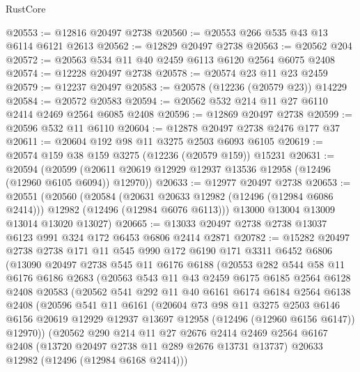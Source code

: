 \begin{lexlean}{RustCore}
\begin{coremodule}
@20553 := @12816 @20497 @2738
@20560 := @20553 @266 @535 @43 @13 @6114 @6121 @2613
@20562 := @12829 @20497 @2738
@20563 := @20562 @204
@20572 := @20563 @534 @11 @40 @2459 @6113 @6120 @2564 @6075 @2408
@20574 := @12228 @20497 @2738
@20578 := @20574 @23 @11 @23 @2459
@20579 := @12237 @20497
@20583 := @20578 (@12236 (@20579 @23)) @14229
@20584 := @20572 @20583
@20594 := @20562 @532 @214 @11 @27 @6110 @2414 @2469 @2564 @6085 @2408
@20596 := @12869 @20497 @2738
@20599 := @20596 @532 @11 @6110
@20604 := @12878 @20497 @2738 @2476 @177 @37
@20611 := @20604 @192 @98 @11 @3275 @2503 @6093 @6105
@20619 := @20574 @159 @38 @159 @3275 (@12236 (@20579 @159)) @15231
@20631 := @20594
    (@20599 (@20611 @20619 @12929 @12937 @13536 @12958 (@12496 (@12960 @6105 @6094)) @12970))
@20633 := @12977 @20497 @2738
@20653 := @20551
    (@20560
      (@20584
        (@20631 @20633 @12982 (@12496 (@12984 @6086 @2414)))
        @12982
        (@12496 (@12984 @6076 @6113)))
      @13000
      @13004
      @13009
      @13014
      @13020
      @13027)
@20665 := @13033 @20497 @2738 @2738 @13037 @6123 @991 @324 @172 @6453 @6806 @2414 @2871
@20782 := @15282
    @20497
    @2738
    @2738
    @171
    @11
    @545
    @990
    @172
    @6190
    @171
    @3311
    @6452
    @6806
    (@13090
      @20497
      @2738
      @545
      @11
      @6176
      @6188
      (@20553
        @282
        @544
        @58
        @11
        @6176
        @6186
        @2683
        (@20563
          @543
          @11
          @43
          @2459
          @6175
          @6185
          @2564
          @6128
          @2408
          @20583
          (@20562
            @541
            @292
            @11
            @40
            @6161
            @6174
            @6184
            @2564
            @6138
            @2408
            (@20596
              @541
              @11
              @6161
              (@20604
                @73
                @98
                @11
                @3275
                @2503
                @6146
                @6156
                @20619
                @12929
                @12937
                @13697
                @12958
                (@12496 (@12960 @6156 @6147))
                @12970))
            (@20562
              @290
              @214
              @11
              @27
              @2676
              @2414
              @2469
              @2564
              @6167
              @2408
              (@13720 @20497 @2738 @11 @289 @2676 @13731 @13737)
              @20633
              @12982
              (@12496 (@12984 @6168 @2414)))

\end{coremodule}
\end{lexlean}
